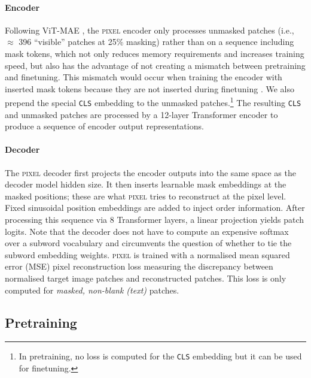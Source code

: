 \documentclass{article}
\newcommand{\model}{\textsc{pixel}\xspace}
\begin{document}
\vspace{-2mm}
\paragraph{Encoder} Following ViT-MAE \citep{he-etal-2022-mae}, the \model encoder only processes unmasked patches (i.e., $\approx$ 396 ``visible'' patches at 25\% masking) rather than on a sequence including mask tokens, which not only reduces memory requirements and increases training speed, but also has the advantage of not creating a mismatch between pretraining and finetuning. This mismatch would occur when training the encoder with inserted mask tokens because they are not inserted during finetuning \citep{he-etal-2022-mae}. We also prepend the special \texttt{CLS} embedding to the unmasked patches.\footnote{In pretraining, no loss is computed for the \texttt{CLS} embedding but it can be used for finetuning.} The resulting \texttt{CLS} and unmasked patches are processed by a 12-layer Transformer encoder to produce a sequence of encoder output representations.

\vspace{-2mm}
\paragraph{Decoder} The \model decoder first projects the encoder outputs into the same space as the decoder model hidden size. It then inserts learnable mask embeddings at the masked positions; these are what \model tries to reconstruct at the pixel level. Fixed sinusoidal position embeddings \citep{DBLP:conf/nips/VaswaniSPUJGKP17} are added to inject order information. After processing this sequence via 8 Transformer layers, a linear projection yields patch logits. Note that the decoder does not have to compute an expensive softmax over a subword vocabulary and circumvents the question of whether to tie the subword embedding weights.
\model is trained with a normalised mean squared error (MSE) pixel reconstruction loss measuring the discrepancy between normalised target image patches and reconstructed patches. This loss is only computed for \emph{masked, non-blank (text)} patches. 

\vspace{-2mm}
\subsection{Pretraining}
\vspace{-2mm}
\end{document}
